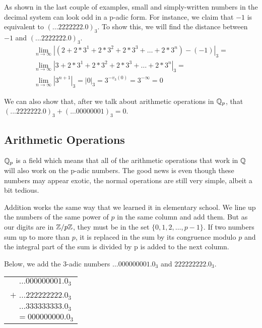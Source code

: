 \documentclass[a4paper]{article}
\begin{document}
As shown in the last couple of examples, small and simply-written
numbers in the decimal system can look odd in a p-adic form.  For
instance, we claim that $-1$ is equivalent to $(...2222222.0)_3$.  To
show this, we will find the distance between $-1$ and
$(...2222222.0)_3$.
\[
\begin{gathered}
  \lim_{n\to\infty}|(2+2*3^{1}+2*3^{2}+2*3^{3}+\dots+2*3^n)-(-1)|_3=\\
  \lim_{n\to\infty}|3+2*3^{1}+2*3^{2}+2*3^{3}+\dots+2*3^n|_3=\\
  \lim_{n\to\infty}|3^{n+1}|_3=|0|_3=3^{-v_3(0)}=3^{-\infty}=0
\end{gathered}
\]

We can also show that, after we talk about arithmetic operations in 
$\mathbb Q_p$, that $(...2222222.0)_3+(...00000001)_3=0$.

\subsection{Arithmetic Operations}

$\mathbb Q_p$ is a field which means that all of the arithmetic operations
that work in $\mathbb Q$ will also work on the p-adic numbers.  The good
news is even though these numbers may appear exotic, the normal
operations are still very simple, albeit a bit tedious.

Addition works the same way that we learned it in elementary school.  We 
line up the numbers of the same power of $p$ in the same column and add 
them.  But as our digits are in $\mathbb Z/p\mathbb Z$, they must be in the
set $\{0,1,2,\dots,p-1\}$.  If two numbers sum up to more than $p$, it is
replaced in the sum by its congruence modulo $p$ and the integral part
of the sum is divided by p is added to the next column.

\begin{example}
Below, we add the 3-adic numbers $\dots000000001.0_3$ and
$222222222.0_3$.

\begin{center}
  \begin{tabular}{c}
    $\;\;\;\;$$\dots000000001.0_3$\\
    $+$ $\dots222222222.0_3$\\
    \hline
    $\;\;\;\;\dots333333333.0_3$\\
    $\;\;\;\;=000000000.0_3$
  \end{tabular}
\end{center}
\end{example}
\end{document}
